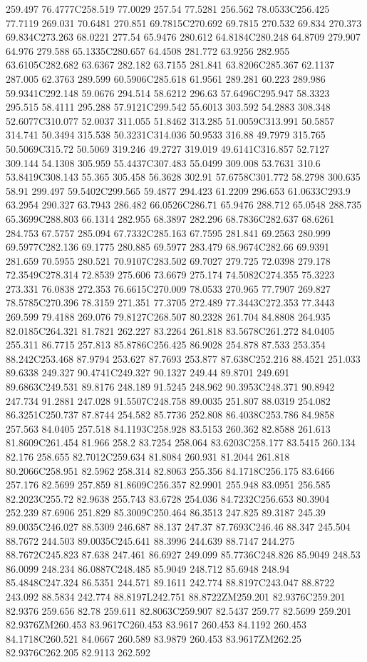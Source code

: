 259.497 76.4777C258.519 77.0029 257.54 77.5281 256.562 78.0533C256.425 77.7119 269.031 70.6481 270.851 69.7815C270.692 69.7815 270.532 69.834 270.373 69.834C273.263 68.0221 277.54 65.9476 280.612 64.8184C280.248 64.8709 279.907 64.976 279.588 65.1335C280.657 64.4508 281.772 63.9256 282.955 63.6105C282.682 63.6367 282.182 63.7155 281.841 63.8206C285.367 62.1137 287.005 62.3763 289.599 60.5906C285.618 61.9561 289.281 60.223 289.986 59.9341C292.148 59.0676 294.514 58.6212 296.63 57.6496C295.947 58.3323 295.515 58.4111 295.288 57.9121C299.542 55.6013 303.592 54.2883 308.348 52.6077C310.077 52.0037 311.055 51.8462 313.285 51.0059C313.991 50.5857 314.741 50.3494 315.538 50.3231C314.036 50.9533 316.88 49.7979 315.765 50.5069C315.72 50.5069 319.246 49.2727 319.019 49.6141C316.857 52.7127 309.144 54.1308 305.959 55.4437C307.483 55.0499 309.008 53.7631 310.6 53.8419C308.143 55.365 305.458 56.3628 302.91 57.6758C301.772 58.2798 300.635 58.91 299.497 59.5402C299.565 59.4877 294.423 61.2209 296.653 61.0633C293.9 63.2954 290.327 63.7943 286.482 66.0526C286.71 65.9476 288.712 65.0548 288.735 65.3699C288.803 66.1314 282.955 68.3897 282.296 68.7836C282.637 68.6261 284.753 67.5757 285.094 67.7332C285.163 67.7595 281.841 69.2563 280.999 69.5977C282.136 69.1775 280.885 69.5977 283.479 68.9674C282.66 69.9391 281.659 70.5955 280.521 70.9107C283.502 69.7027 279.725 72.0398 279.178 72.3549C278.314 72.8539 275.606 73.6679 275.174 74.5082C274.355 75.3223 273.331 76.0838 272.353 76.6615C270.009 78.0533 270.965 77.7907 269.827 78.5785C270.396 78.3159 271.351 77.3705 272.489 77.3443C272.353 77.3443 269.599 79.4188 269.076 79.8127C268.507 80.2328 261.704 84.8808 264.935 82.0185C264.321 81.7821 262.227 83.2264 261.818 83.5678C261.272 84.0405 255.311 86.7715 257.813 85.8786C256.425 86.9028 254.878 87.533 253.354 88.242C253.468 87.9794 253.627 87.7693 253.877 87.638C252.216 88.4521 251.033 89.6338 249.327 90.4741C249.327 90.1327 249.44 89.8701 249.691 89.6863C249.531 89.8176 248.189 91.5245 248.962 90.3953C248.371 90.8942 247.734 91.2881 247.028 91.5507C248.758 89.0035 251.807 88.0319 254.082 86.3251C250.737 87.8744 254.582 85.7736 252.808 86.4038C253.786 84.9858 257.563 84.0405 257.518 84.1193C258.928 83.5153 260.362 82.8588 261.613 81.8609C261.454 81.966 258.2 83.7254 258.064 83.6203C258.177 83.5415 260.134 82.176 258.655 82.7012C259.634 81.8084 260.931 81.2044 261.818 80.2066C258.951 82.5962 258.314 82.8063 255.356 84.1718C256.175 83.6466 257.176 82.5699 257.859 81.8609C256.357 82.9901 255.948 83.0951 256.585 82.2023C255.72 82.9638 255.743 83.6728 254.036 84.7232C256.653 80.3904 252.239 87.6906 251.829 85.3009C250.464 86.3513 247.825 89.3187 245.39 89.0035C246.027 88.5309 246.687 88.137 247.37 87.7693C246.46 88.347 245.504 88.7672 244.503 89.0035C245.641 88.3996 244.639 88.7147 244.275 88.7672C245.823 87.638 247.461 86.6927 249.099 85.7736C248.826 85.9049 248.53 86.0099 248.234 86.0887C248.485 85.9049 248.712 85.6948 248.94 85.4848C247.324 86.5351 244.571 89.1611 242.774 88.8197C243.047 88.8722 243.092 88.5834 242.774 88.8197L242.751 88.8722ZM259.201 82.9376C259.201 82.9376 259.656 82.78 259.611 82.8063C259.907 82.5437 259.77 82.5699 259.201 82.9376ZM260.453 83.9617C260.453 83.9617 260.453 84.1192 260.453 84.1718C260.521 84.0667 260.589 83.9879 260.453 83.9617ZM262.25 82.9376C262.205 82.9113 262.592 